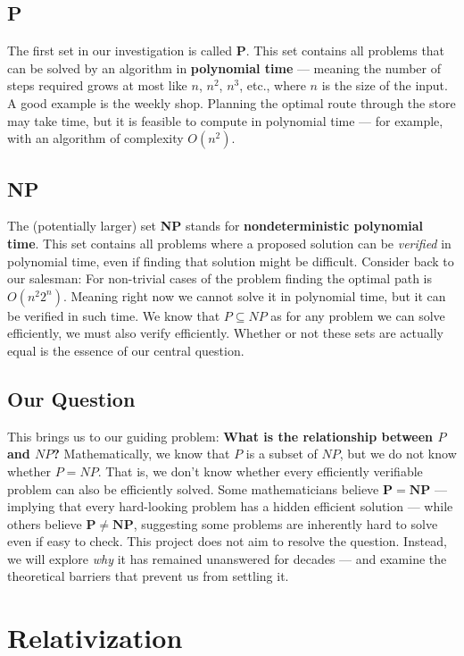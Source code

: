 \documentclass[12pt]{report}
\begin{document}
\section{P}
The first set in our investigation is called \textbf{P}.
This set contains all problems that can be solved by an algorithm in \textbf{polynomial time} --- meaning the number of steps required grows at most like $n$, $n^2$, $n^3$, etc., where $n$ is the size of the input.
A good example is the weekly shop.
Planning the optimal route through the store may take time, but it is feasible to compute in polynomial time --- for example, with an algorithm of complexity $O(n^2)$.

\section{NP}
The (potentially larger) set \textbf{NP} stands for \textbf{nondeterministic polynomial time}.
This set contains all problems where a proposed solution can be \textit{verified} in polynomial time, even if finding that solution might be difficult.
Consider back to our salesman: For non-trivial cases of the problem finding the optimal path is \( O(n^2 2^n) \).
Meaning right now we cannot solve it in polynomial time, but it can be verified in such time.
We know that $P \subseteq NP$ as for any problem we can solve efficiently, we must also verify efficiently.
Whether or not these sets are actually equal is the essence of our central question.

\section{Our Question}
This brings us to our guiding problem: \textbf{What is the relationship between $P$ and $NP$?}
Mathematically, we know that $P$ is a subset of $NP$, but we do not know whether $P = NP$.
That is, we don't know whether every efficiently verifiable problem can also be efficiently solved.
Some mathematicians believe $\mathbf{P = NP}$ --- implying that every hard-looking problem has a hidden efficient solution --- while others believe $\mathbf{P \neq NP}$, suggesting some problems are inherently hard to solve even if easy to check.
This project does not aim to resolve the question.
Instead, we will explore \textit{why} it has remained unanswered for decades --- and examine the theoretical barriers that prevent us from settling it.

\newpage
\chapter{Relativization}
\end{document}
